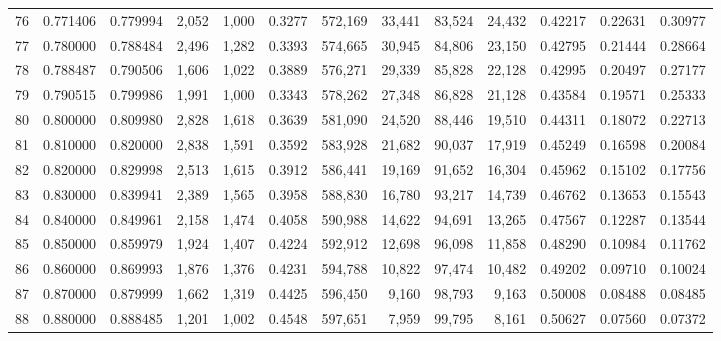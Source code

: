 \begin{tabular}{rrrrrrrrrrrrr}
76 &  0.771406 &  0.779994 &   2,052 &  1,000 &                                     0.3277 &  572,169 &   33,441 &   83,524 &   24,432 &  0.42217 &  0.22631 &  0.30977 \\
77 &  0.780000 &  0.788484 &   2,496 &  1,282 &                                     0.3393 &  574,665 &   30,945 &   84,806 &   23,150 &  0.42795 &  0.21444 &  0.28664 \\
78 &  0.788487 &  0.790506 &   1,606 &  1,022 &                                     0.3889 &  576,271 &   29,339 &   85,828 &   22,128 &  0.42995 &  0.20497 &  0.27177 \\
79 &  0.790515 &  0.799986 &   1,991 &  1,000 &                                     0.3343 &  578,262 &   27,348 &   86,828 &   21,128 &  0.43584 &  0.19571 &  0.25333 \\
80 &  0.800000 &  0.809980 &   2,828 &  1,618 &                                     0.3639 &  581,090 &   24,520 &   88,446 &   19,510 &  0.44311 &  0.18072 &  0.22713 \\
81 &  0.810000 &  0.820000 &   2,838 &  1,591 &                                     0.3592 &  583,928 &   21,682 &   90,037 &   17,919 &  0.45249 &  0.16598 &  0.20084 \\
82 &  0.820000 &  0.829998 &   2,513 &  1,615 &                                     0.3912 &  586,441 &   19,169 &   91,652 &   16,304 &  0.45962 &  0.15102 &  0.17756 \\
83 &  0.830000 &  0.839941 &   2,389 &  1,565 &                                     0.3958 &  588,830 &   16,780 &   93,217 &   14,739 &  0.46762 &  0.13653 &  0.15543 \\
84 &  0.840000 &  0.849961 &   2,158 &  1,474 &                                     0.4058 &  590,988 &   14,622 &   94,691 &   13,265 &  0.47567 &  0.12287 &  0.13544 \\
85 &  0.850000 &  0.859979 &   1,924 &  1,407 &                                     0.4224 &  592,912 &   12,698 &   96,098 &   11,858 &  0.48290 &  0.10984 &  0.11762 \\
86 &  0.860000 &  0.869993 &   1,876 &  1,376 &                                     0.4231 &  594,788 &   10,822 &   97,474 &   10,482 &  0.49202 &  0.09710 &  0.10024 \\
87 &  0.870000 &  0.879999 &   1,662 &  1,319 &                                     0.4425 &  596,450 &    9,160 &   98,793 &    9,163 &  0.50008 &  0.08488 &  0.08485 \\
88 &  0.880000 &  0.888485 &   1,201 &  1,002 &                                     0.4548 &  597,651 &    7,959 &   99,795 &    8,161 &  0.50627 &  0.07560 &  0.07372 \\

\end{tabular}
